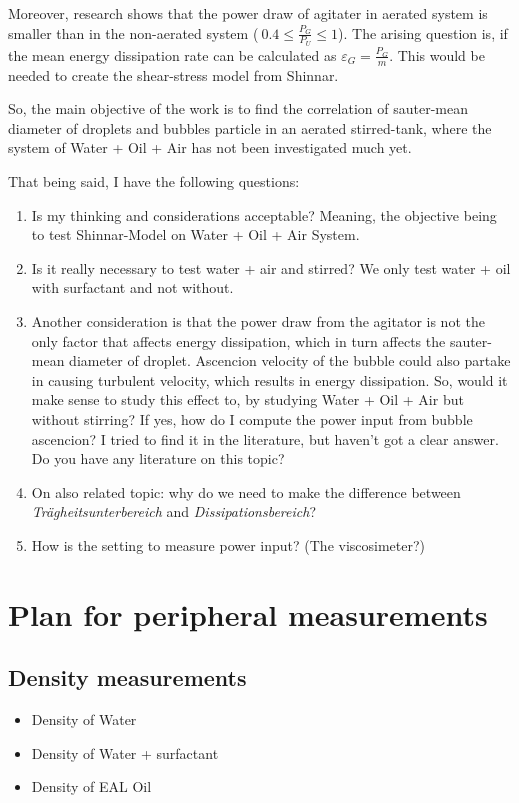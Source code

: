 Moreover, research shows that the power draw of agitater in aerated system is smaller than in the non-aerated system ($~0.4 \leqslant \frac{P_G}{P_U} \leqslant 1$). The arising question is, if the mean energy dissipation rate can be calculated as $\varepsilon_G = \frac{P_G}{m}$. This would be needed to create the shear-stress model from Shinnar.

So, the main objective of the work is to find the correlation of sauter-mean diameter of droplets and bubbles particle in an aerated stirred-tank, where the system of Water + Oil + Air has not been investigated much yet.

That being said, I have the following questions:
\begin{enumerate}
  \item Is my thinking and considerations acceptable? Meaning, the objective being to test Shinnar-Model on Water + Oil + Air System.
  \item Is it really necessary to test water + air and stirred? We only test water + oil with surfactant and not without.
  \item Another consideration is that the power draw from the agitator is not the only factor that affects energy dissipation, which in turn affects the sauter-mean diameter of droplet. Ascencion velocity of the bubble could also partake in causing turbulent velocity, which results in energy dissipation. So, would it make sense to study this effect to, by studying Water + Oil + Air but without stirring? If yes, how do I compute the power input from bubble ascencion? I tried to find it in the literature, but haven’t got a clear answer. Do you have any literature on this topic?
  \item On also related topic: why do we need to make the difference between \textit{Trägheitsunterbereich} and \textit{Dissipationsbereich}?
  \item How is the setting to measure power input? (The viscosimeter?)
\end{enumerate}


\section{Plan for peripheral measurements}
\subsection{Density measurements}
\begin{itemize}
  \item Density of Water
  \item Density of Water + surfactant
  \item Density of EAL Oil
\end{itemize}

